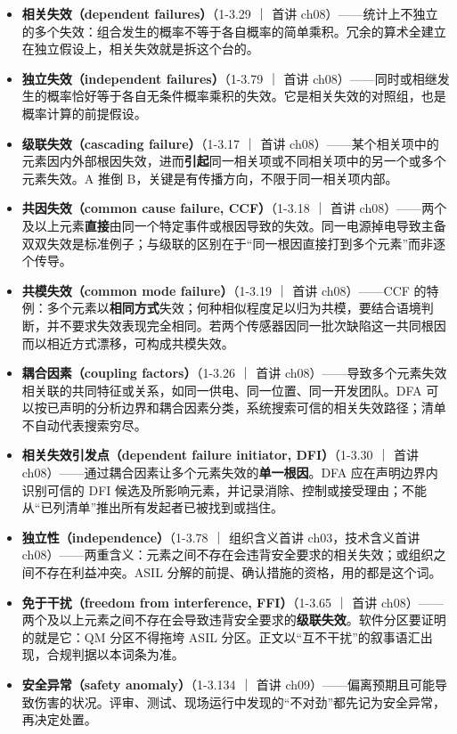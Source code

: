 \begin{itemize}
\item \textbf{相关失效（dependent failures）}（1-3.29 ｜ 首讲 ch08）——统计上不独立的多个失效：组合发生的概率不等于各自概率的简单乘积。冗余的算术全建立在独立假设上，相关失效就是拆这个台的。
\item \textbf{独立失效（independent failures）}（1-3.79 ｜ 首讲 ch08）——同时或相继发生的概率恰好等于各自无条件概率乘积的失效。它是相关失效的对照组，也是概率计算的前提假设。
\item \textbf{级联失效（cascading failure）}（1-3.17 ｜ 首讲 ch08）——某个相关项中的元素因内外部根因失效，进而\textbf{引起}同一相关项或不同相关项中的另一个或多个元素失效。A 推倒 B，关键是有传播方向，不限于同一相关项内部。
\item \textbf{共因失效（common cause failure, CCF）}（1-3.18 ｜ 首讲 ch08）——两个及以上元素\textbf{直接}由同一个特定事件或根因导致的失效。同一电源掉电导致主备双双失效是标准例子；与级联的区别在于“同一根因直接打到多个元素”而非逐个传导。
\item \textbf{共模失效（common mode failure）}（1-3.19 ｜ 首讲 ch08）——CCF 的特例：多个元素以\textbf{相同方式}失效；何种相似程度足以归为共模，要结合语境判断，并不要求失效表现完全相同。若两个传感器因同一批次缺陷这一共同根因而以相近方式漂移，可构成共模失效。
\item \textbf{耦合因素（coupling factors）}（1-3.26 ｜ 首讲 ch08）——导致多个元素失效相关联的共同特征或关系，如同一供电、同一位置、同一开发团队。DFA 可以按已声明的分析边界和耦合因素分类，系统搜索可信的相关失效路径；清单不自动代表搜索穷尽。
\item \textbf{相关失效引发点（dependent failure initiator, DFI）}（1-3.30 ｜ 首讲 ch08）——通过耦合因素让多个元素失效的\textbf{单一根因}。DFA 应在声明边界内识别可信的 DFI 候选及所影响元素，并记录消除、控制或接受理由；不能从“已列清单”推出所有发起者已被找到或挡住。
\item \textbf{独立性（independence）}（1-3.78 ｜ 组织含义首讲 ch03，技术含义首讲 ch08）——两重含义：元素之间不存在会违背安全要求的相关失效；或组织之间不存在利益冲突。ASIL 分解的前提、确认措施的资格，用的都是这个词。
\item \textbf{免于干扰（freedom from interference, FFI）}（1-3.65 ｜ 首讲 ch08）——两个及以上元素之间不存在会导致违背安全要求的\textbf{级联失效}。软件分区要证明的就是它：QM 分区不得拖垮 ASIL 分区。正文以“互不干扰”的叙事语汇出现，合规判据以本词条为准。
\item \textbf{安全异常（safety anomaly）}（1-3.134 ｜ 首讲 ch09）——偏离预期且可能导致伤害的状况。评审、测试、现场运行中发现的“不对劲”都先记为安全异常，再决定处置。
\end{itemize}

